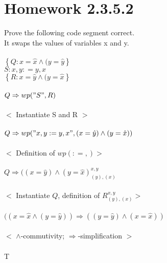 \documentclass{article}
\begin{document}
\section{Homework 2.3.5.2}
Prove the following code segment correct. 
\\
It swaps the values of variables x and y.
\\
\\
$\left\{Q: x = \hat{x} \land (y = \hat{y}\right\}$
\\
$S : x, y : = y , x$
\\
$\left\{R: x = \hat{y} \land (y = \hat{x}\right\}$
\\
\\
$Q \Rightarrow wp("S", R)$
\\
\\
$<$ Instantiate S and R $>$
\\
\\
$Q \Rightarrow wp("x, y : = y, x", (x = \hat{y}) \land (y = \hat{x}))$
\\
\\
$<$ Definition of $wp(: =,) >$
\\
\\
$Q \Rightarrow {(( x = \hat{y}) \land (y = \hat{x})}_{(y),(x)}^{x, y}$
\\
\\
$<$ Instantiate $Q$, definition of $R_{(y),(x)}^{x,y} >$
\\
\\
$((x = \hat{x} \land (y = \hat{y})) \Rightarrow ((y = \hat{y}) \land (x = \hat{x}))$
\\
\\
$<$ $\land$-commutivity; $\Rightarrow$-simplification $>$
\\
\\
T
\\
\\
\end{document}
